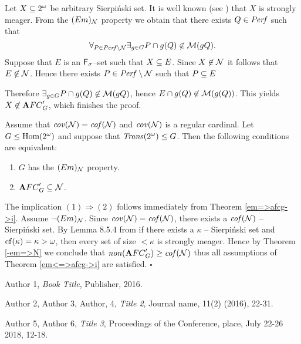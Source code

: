 \proof

  Let $X\subseteq2^{\omega}$ be arbitrary Sierpi\'nski set.
It is well known (see \cite{P}) that $X$ is
strongly meager.
  From the $(Em)_{{\cal N}}$ property we obtain that
there exists $Q \in {\it Perf}$ such that
  \[
    \forall_{P \in {\it Perf} \setminus {\cal N}}
    \exists_{g \in G} P \cap g(Q) \not\in {\cal M}(gQ).
  \]
Suppose that $E$ is an ${\sf F}_{\sigma}$--set such that $X \subseteq E$.
Since $X \not \in {\cal N}$ it follows that $E \not \in {\cal N}$.
  Hence there exists $P \in {\it Perf} \setminus {\cal N} $ such that
$P \subseteq E$

Therefore $\exists_{g \in G} P \cap g(Q) \not\in {\cal M}(gQ)$,
hence $E \cap g(Q) \not\in {\cal M}(g(Q))$.
  This yields $X \not\in {\mathbf AFC}^\prime_{G}$, which finishes the proof.

\begin{corollary}
\label{corollary_1}
  Assume that ${\it cov}({\cal N}) = {\it cof}({\cal N})$ and
${\it cov}({\cal N})$ is a regular cardinal.
  Let $G \leq {\rm Hom(2^{\omega})}$ and suppose that ${\it Trans}(2^{\omega}) \leq G$.
Then the following conditions are equivalent:

  \begin{enumerate}
  \item
    $G$ has the $(Em)_{{\cal N}}$ property.

  \item
    ${\mathbf AFC}^\prime_{G} \subseteq {\cal N}$.

  \end{enumerate}
\end{corollary}

\proof
  The implication $(1) \Rightarrow (2)$ follows immediately
from Theorem \ref{em=>afcg->i}.
  Assume $\neg (Em)_{{\cal N}}$. Since ${\it cov}({\cal N}) = {\it cof}({\cal N})$,
there exists a ${\it cof}({\cal N})$ -- Sierpi\'nski set.
  By Lemma 8.5.4 from \cite{BJ}
if there exists a $\kappa$ -- Sierpi\'nski set
and ${\rm cf}(\kappa) = \kappa > \omega$,
then every set of size $< \kappa$ is strongly meager.
  Hence by Theorem \ref{-em=>N} we conclude that
${\it non}({\mathbf AFC}^\prime_{G}) \geq {\it cof}({\cal N})$
thus all assumptions of Theorem \ref{em<=>afcg->i} are satisfied.
  $\square$




\begin{thebibliography}{99}  %
\setlength{\itemsep}{6pt}

 Author 1, \textit{Book Title}, Publisher, 2016.

 Author 2, Author 3, Author, 4, \textit{Title 2}, Journal name, 11(2) (2016), 22-31.

 Author 5, Author 6, \textit{Title 3}, Proceedings of the Conference, place, July 22-26 2018, 12-18.
\end{thebibliography}




